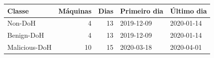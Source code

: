 \begin{tabular}{lrrll}
\hline
\textbf{Classe} & \textbf{Máquinas} & \textbf{Dias} & \textbf{Primeiro dia} & \textbf{Último dia} \\ \hline
Non-DoH & 4 & 13 & 2019-12-09 & 2020-01-14 \\
Benign-DoH & 4 & 13 & 2019-12-09 & 2020-01-14 \\
Malicious-DoH & 10 & 15 & 2020-03-18 & 2020-04-01 \\
\hline
\end{tabular}
